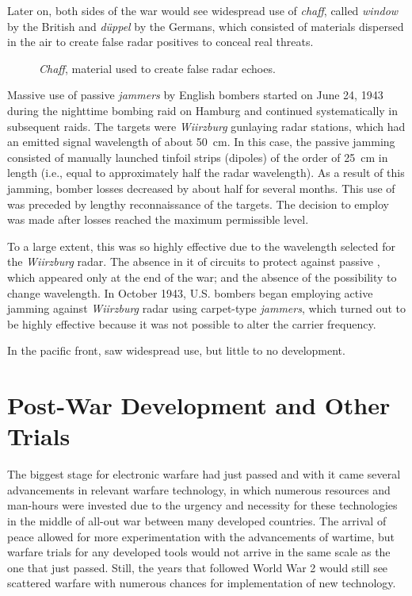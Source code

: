 \documentclass[english,purist]{ist-report}
\begin{document}
Later on, both sides of the war would see widespread use of \textit{chaff}, called \textit{window} by the British and \textit{düppel} by the Germans, which consisted of materials dispersed in the air to create false radar positives to conceal real threats.
\begin{figure}[ht]
    \centering
    \caption{\textit{Chaff}, material used to create false radar echoes.}
    \label{fig:chaff}
\end{figure}

Massive use of passive \textit{jammers} by English bombers started on June 24, 1943 during the nighttime bombing raid on Hamburg and continued systematically in subsequent raids. The \jamming{} targets were \textit{Wiirzburg} gunlaying radar stations, which had an emitted signal wavelength of about \SI{50}{\centi\meter}. In this case, the passive jamming consisted of manually launched tinfoil strips (dipoles) of the order of \SI{25}{\centi\meter} in length (i.e., equal to approximately half the radar wavelength). As a result of this jamming, bomber losses decreased by about half for several months. This use of \jamming{} was preceded by lengthy reconnaissance of the \jamming{} targets. The decision to employ \jamming{} was made after losses reached the maximum permissible level.

To a large extent, this \jamming{} was so highly effective due to the
wavelength selected for the \textit{Wiirzburg} radar. The absence in it of circuits to protect against passive \jamming{}, which appeared only at the end of the war; and the absence of the possibility to change wavelength. In October 1943, U.S. bombers began employing active jamming against \textit{Wiirzburg} radar using carpet-type \textit{jammers}, which turned out to be highly effective because it was not possible to alter the carrier frequency.

In the pacific front, \jamming{} saw widespread use, but little to no development.

\section{Post-War Development and Other Trials}

The biggest stage for electronic warfare had just passed and with it came several advancements in relevant warfare technology, in which numerous resources and man-hours were invested due to the urgency and necessity for these technologies in the middle of all-out war between many developed countries. The arrival of peace allowed for more experimentation with the advancements of wartime, but warfare trials for any developed tools would not arrive in the same scale as the one that just passed. Still, the years that followed World War 2 would still see scattered warfare with numerous chances for implementation of new technology.
\end{document}
